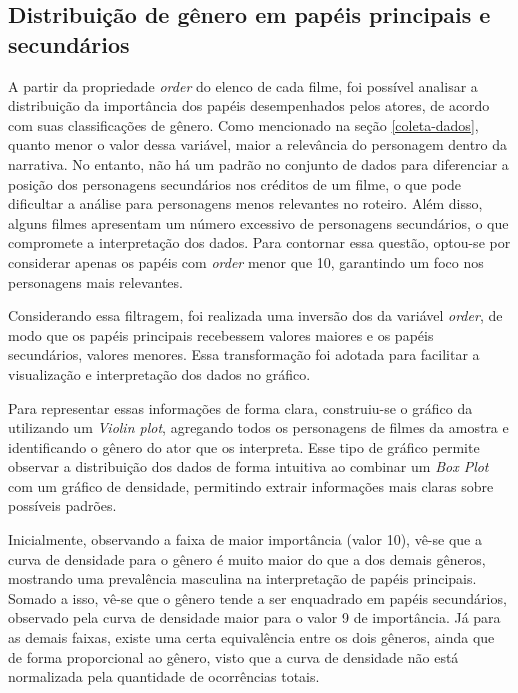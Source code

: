 \subsection{Distribuição de gênero em papéis principais e secundários}
A partir da propriedade \textit{order} do elenco de cada filme, foi possível analisar a distribuição da importância dos papéis desempenhados pelos atores, de acordo com suas classificações de gênero. Como mencionado na seção \ref{coleta-dados}, quanto menor o valor dessa variável, maior a relevância do personagem dentro da narrativa. No entanto, não há um padrão no conjunto de dados para diferenciar a posição dos personagens secundários nos créditos de um filme, o que pode dificultar a análise para personagens menos relevantes no roteiro. Além disso, alguns filmes apresentam um número excessivo de personagens secundários, o que compromete a interpretação dos dados. Para contornar essa questão, optou-se por considerar apenas os papéis com \textit{order} menor que 10, garantindo um foco nos personagens mais relevantes.

Considerando essa filtragem, foi realizada uma inversão dos da variável \textit{order}, de modo que os papéis principais recebessem valores maiores e os papéis secundários, valores menores. Essa transformação foi adotada para facilitar a visualização e interpretação dos dados no gráfico.

Para representar essas informações de forma clara, construiu-se o gráfico da  utilizando um \textit{Violin plot}, agregando todos os personagens de filmes da amostra e identificando o gênero do ator que os interpreta. Esse tipo de gráfico permite observar a distribuição dos dados de forma intuitiva ao combinar um \textit{Box Plot} com um gráfico de densidade, permitindo extrair informações mais claras sobre possíveis padrões.

%

Inicialmente, observando a faixa de maior importância (valor 10), vê-se que a curva de densidade para o gênero  é muito  maior do que a dos demais gêneros, mostrando uma prevalência masculina na interpretação de papéis principais. Somado a isso, vê-se que o gênero  tende a ser enquadrado em papéis secundários, observado pela curva de densidade maior para o valor 9 de importância. Já para as demais faixas, existe uma certa equivalência entre os dois gêneros, ainda que de forma proporcional ao gênero, visto que a curva de densidade não está normalizada pela quantidade de ocorrências totais.

